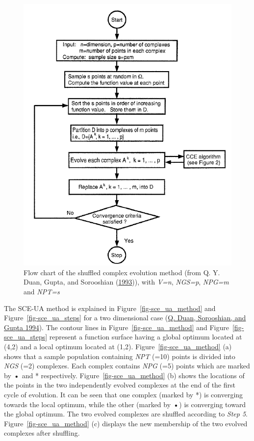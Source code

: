 \documentclass[
  letterpaper,
  DIV=11,
  numbers=noendperiod]{scrreprt}
\begin{document}
\begin{figure}

{\centering \includegraphics{./figures/fig-flowchart_sce.png}

}

\caption{\label{fig-flowchart_sce}Flow chart of the shuffled complex
evolution method (from Q. Y. Duan, Gupta, and Sorooshian
(\protect\hyperlink{ref-duan_shuffled_1993}{1993})), with \emph{V=n},
\emph{NGS=p}, \emph{NPG=m} and \emph{NPT=s}}

\end{figure}

The SCE-UA method is explained in Figure~\ref{fig-sce_ua_method} and
Figure~\ref{fig-sce_ua_steps} for a two dimensional case
(\protect\hyperlink{ref-duan_optimal_1994}{Q. Duan, Sorooshian, and
Gupta 1994}). The contour lines in Figure~\ref{fig-sce_ua_method} and
Figure~\ref{fig-sce_ua_steps} represent a function surface having a
global optimum located at (4,2) and a local optimum located at (1,2).
Figure~\ref{fig-sce_ua_method} (a) shows that a sample population
containing \emph{NPT} (=10) points is divided into \emph{NGS} (=2)
complexes. Each complex contains \emph{NPG} (=5) points which are marked
by \textbf{•} and * respectively. Figure~\ref{fig-sce_ua_method} (b)
shows the locations of the points in the two independently evolved
complexes at the end of the first cycle of evolution. It can be seen
that one complex (marked by *) is converging towards the local optimum,
while the other (marked by \textbf{•}) is converging toward the global
optimum. The two evolved complexes are shuffled according to \emph{Step
5}. Figure~\ref{fig-sce_ua_method} (c) displays the new membership of
the two evolved complexes after shuffling.
\end{document}
